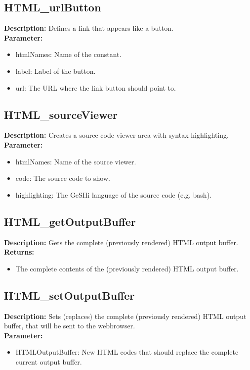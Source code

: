 \subsection{HTML\_urlButton}
\textbf{Description:} Defines a link that appears like a button.\\
\textbf{Parameter:}
\begin{itemize}
\item htmlNames: Name of the constant.
\item label: Label of the button.
\item url: The URL where the link button should point to.
\end{itemize}

\subsection{HTML\_sourceViewer}
\textbf{Description:} Creates a source code viewer area with syntax highlighting.\\
\textbf{Parameter:}
\begin{itemize}
\item htmlNames: Name of the source viewer.
\item code: The source code to show.
\item highlighting: The GeSHi language of the source code (e.g. bash).
\end{itemize}

\subsection{HTML\_getOutputBuffer}
\textbf{Description:} Gets the complete (previously rendered) HTML output buffer.\\
\textbf{Returns:}
\begin{itemize}
\item The complete contents of the (previously rendered) HTML output buffer.
\end{itemize}

\subsection{HTML\_setOutputBuffer}
\textbf{Description:} Sets (replaces) the complete (previously rendered) HTML output buffer, that will be sent to the webbrowser.\\
\textbf{Parameter:}
\begin{itemize}
\item HTMLOutputBuffer: New HTML codes that should replace the complete current output buffer.
\end{itemize}

